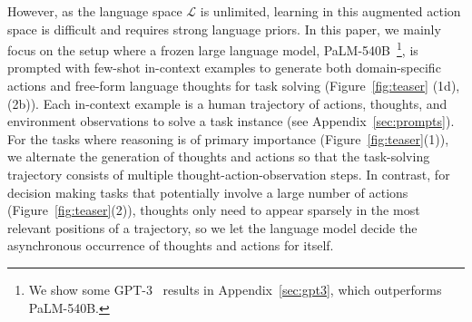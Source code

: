 However, as the language space $\mathcal{L}$ is unlimited, learning in this augmented action space is difficult and requires strong language priors. In this paper, we mainly focus on 
the setup where a frozen large language model, PaLM-540B~\citep{chowdhery2022palm}\footnote{We show some GPT-3~\citep{brown2020language} results in Appendix~\ref{sec:gpt3}, which outperforms PaLM-540B. }, is prompted with few-shot in-context examples to generate both domain-specific actions and free-form language thoughts for task solving (Figure~\ref{fig:teaser} (1d), (2b)). Each in-context example is a human trajectory of actions, thoughts, and environment observations to solve a task instance (see Appendix~\ref{sec:prompts}). 
For the tasks where reasoning is of primary importance (Figure~\ref{fig:teaser}(1)), we alternate the generation of thoughts and actions so that the task-solving trajectory consists of multiple thought-action-observation steps.
In contrast, for  decision making tasks that potentially involve a large number of actions (Figure~\ref{fig:teaser}(2)), thoughts only need to appear sparsely in the most relevant positions of a trajectory, so we let the language model decide the asynchronous occurrence of thoughts and actions for itself.

